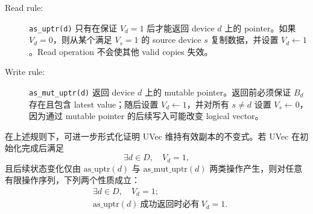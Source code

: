 \begin{description}
  \item[Read rule:] \texttt{as\_uptr(d)} 只有在保证 \(V_d = 1\) 后才能返回 device \(d\) 上的 pointer。如果 \(V_d = 0\)，则从某个满足 \(V_s = 1\) 的 source device \(s\) 复制数据，并设置 \(V_d \leftarrow 1\)。Read operation 不会使其他 valid copies 失效。
  \item[Write rule:] \texttt{as\_mut\_uptr(d)} 返回 device \(d\) 上的 mutable pointer。返回前必须保证 \(B_d\) 存在且包含 latest value；随后设置 \(V_d \leftarrow 1\)，并对所有 \(s \ne d\) 设置 \(V_s \leftarrow 0\)，因为通过 mutable pointer 的后续写入可能改变 logical vector。
\end{description}

在上述规则下，可进一步形式化证明 UVec 维持有效副本的不变式。若 UVec 在初始化完成后满足
\[
  \exists d \in D,\quad V_d = 1,
\]
且后续状态变化仅由 \(\mathrm{as\_uptr}(d)\) 与 \(\mathrm{as\_mut\_uptr}(d)\) 两类操作产生，则对任意有限操作序列，下列两个性质成立：
\begin{align}
  &\exists d \in D,\quad V_d = 1; \label{eq:uvec-invariant}\\
  &\mathrm{as\_uptr}(d)\ \text{成功返回时必有}\ V_d = 1. \label{eq:uvec-read-valid}
\end{align}
